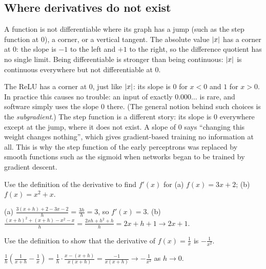 \subsection{Where derivatives do not exist}

A function is not differentiable where its graph has a jump (such as the step
function at $0$), a corner, or a vertical tangent. The absolute value $\lvert x\rvert$
has a corner at $0$: the slope is $-1$ to the left and $+1$ to the right, so
the difference quotient has no single limit. Being differentiable is stronger
than being continuous: $\lvert x\rvert$ is continuous everywhere but not differentiable
at $0$.

\begin{mlnote}
The ReLU has a corner at $0$, just like $\lvert x\rvert$: its slope is $0$ for $x < 0$
and $1$ for $x > 0$. In practice this causes no trouble: an input of exactly
$0.000\ldots$ is rare, and software simply uses the slope $0$ there. (The
general notion behind such choices is the \emph{subgradient}.) The step
function is a different story: its slope is $0$ everywhere except at the jump,
where it does not exist. A slope of $0$ says ``changing this weight changes
nothing'', which gives gradient-based training no information at all. This is
why the step function of the early perceptrons was replaced by smooth
functions such as the sigmoid when networks began to be trained by gradient
descent.
\end{mlnote}

\sectionexercises

\begin{exercise}
Use the definition of the derivative to find $f'(x)$ for (a) $f(x) = 3x + 2$;
(b) $f(x) = x^2 + x$.
\end{exercise}
\begin{solution}
(a) $\tfrac{3(x + h) + 2 - 3x - 2}{h} = \tfrac{3h}{h} = 3$, so $f'(x) = 3$.
(b) $\tfrac{(x+h)^2 + (x + h) - x^2 - x}{h} = \tfrac{2xh + h^2 + h}{h} =
2x + h + 1 \to 2x + 1$.
\end{solution}

\begin{exercise}
Use the definition to show that the derivative of $f(x) = \frac1x$ is
$-\frac{1}{x^2}$.
\end{exercise}
\begin{solution}
$\tfrac1h\left(\tfrac{1}{x+h} - \tfrac1x\right) = \tfrac1h\cdot\tfrac{x - (x+h)}{x(x+h)}
= \tfrac{-1}{x(x+h)} \to -\tfrac{1}{x^2}$ as $h\to0$.
\end{solution}

